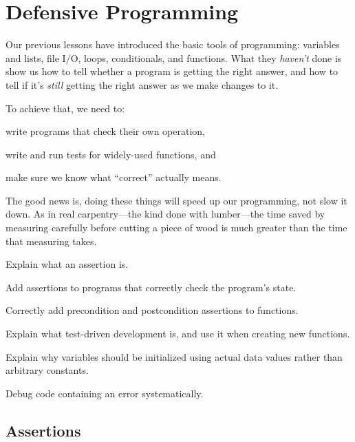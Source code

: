 \section{Defensive Programming}

Our previous lessons have introduced the basic tools of programming:
variables and lists, file I/O, loops, conditionals, and functions. What
they \emph{haven't} done is show us how to tell whether a program is
getting the right answer, and how to tell if it's \emph{still} getting
the right answer as we make changes to it.

To achieve that, we need to:

\begin{swcitemize}
\item
  write programs that check their own operation,
\item
  write and run tests for widely-used functions, and
\item
  make sure we know what ``correct'' actually means.
\end{swcitemize}

The good news is, doing these things will speed up our programming, not
slow it down. As in real carpentry---the kind done with lumber---the
time saved by measuring carefully before cutting a piece of wood is much
greater than the time that measuring takes.

\begin{objectives}
\begin{swcitemize}
\item
  Explain what an assertion is.
\item
  Add assertions to programs that correctly check the program's state.
\item
  Correctly add precondition and postcondition assertions to functions.
\item
  Explain what test-driven development is, and use it when creating new
  functions.
\item
  Explain why variables should be initialized using actual data values
  rather than arbitrary constants.
\item
  Debug code containing an error systematically.
\end{swcitemize}
\end{objectives}

\subsection{Assertions}


